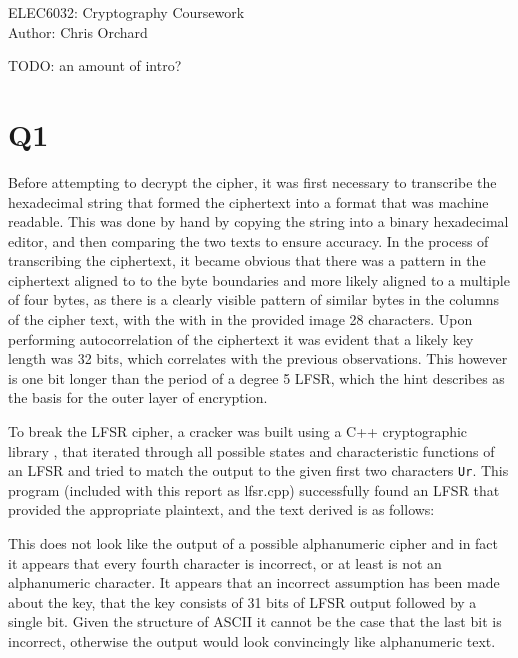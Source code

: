 \documentclass[pdflatex, a4paper,12pt]{article}
\begin{document}
\begin{center}
{\LARGE ELEC6032: Cryptography Coursework}\\[1em]

Author: Chris Orchard\\
\end{center}

TODO: an amount of intro?

\section{Q1}

Before attempting to decrypt the cipher, it was first necessary to transcribe
the hexadecimal string that formed the ciphertext into a format that was machine
readable. This was done by hand by copying the string into a binary hexadecimal
editor, and then comparing the two texts to ensure accuracy. In the process of
transcribing the ciphertext, it became obvious that there was a pattern in the
ciphertext aligned to to the byte boundaries and more likely aligned to a
multiple of four bytes, as there is a clearly visible pattern of similar bytes
in the columns of the cipher text, with the with in the provided image 28
characters. Upon performing autocorrelation of the ciphertext it was evident
that a likely key length was 32 bits, which correlates with the previous
observations. This however is one bit longer than the period of a degree 5 LFSR,
which the hint describes as the basis for the outer layer of encryption.

To break the LFSR cipher, a cracker was built using a C++ cryptographic library
\cite{_cryptographic-c---toolkit_????}, that iterated
through all possible states and characteristic functions of an LFSR and tried to
match the output to the given first two characters \verb+Ur+. This program
(included with this report as lfsr.cpp) successfully found an LFSR that provided
the appropriate plaintext, and the text derived is as follows:

\begin{quote}

\end{quote}

This does not look like the output of a possible alphanumeric cipher and in
fact it appears that every fourth character is incorrect, or at least is not an
alphanumeric character. It appears that an incorrect assumption has been made
about the key, that the key consists of 31 bits of LFSR output followed by a
single bit. Given the structure of ASCII it cannot be the case that the last bit
is incorrect, otherwise the output would look convincingly like alphanumeric text. 
\end{document}
